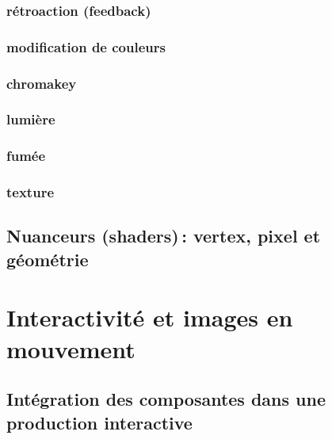 \documentclass[
]{book}
\begin{document}
\hypertarget{ruxe9troaction-feedback}{%
\subsection{rétroaction (feedback)}\label{ruxe9troaction-feedback}}

\hypertarget{modification-de-couleurs}{%
\subsection{modification de couleurs}\label{modification-de-couleurs}}

\hypertarget{chromakey}{%
\subsection{chromakey}\label{chromakey}}

\hypertarget{lumiuxe8re}{%
\subsection{lumière}\label{lumiuxe8re}}

\hypertarget{fumuxe9e}{%
\subsection{fumée}\label{fumuxe9e}}

\hypertarget{texture-1}{%
\subsection{texture}\label{texture-1}}

\hypertarget{nuanceurs-shaders-vertex-pixel-et-guxe9omuxe9trie}{%
\section{Nuanceurs (shaders)\,: vertex, pixel et géométrie}\label{nuanceurs-shaders-vertex-pixel-et-guxe9omuxe9trie}}

\hypertarget{interagir}{%
\chapter{Interactivité et images en mouvement}\label{interagir}}

\hypertarget{intuxe9gration-des-composantes-dans-une-production-interactive}{%
\section{Intégration des composantes dans une production interactive}\label{intuxe9gration-des-composantes-dans-une-production-interactive}}
\end{document}
